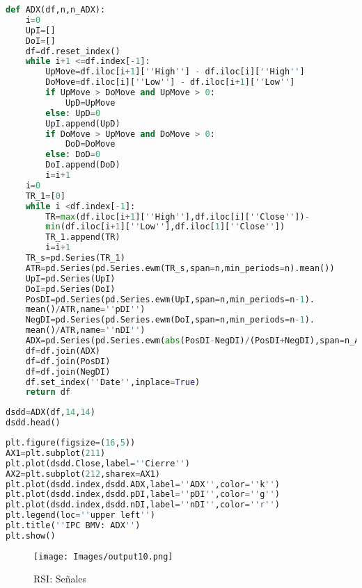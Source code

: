 \documentclass[letterpaper,12pt,oneside]{book}
\begin{document}
\begin{lstlisting}[language=Python]
def ADX(df,n,n_ADX):
    i=0
    UpI=[]
    DoI=[]
    df=df.reset_index()
    while i+1 <=df.index[-1]:
        UpMove=df.iloc[i+1][''High''] - df.iloc[i][''High'']
        DoMove=df.iloc[i][''Low''] - df.iloc[i+1][''Low'']
        if UpMove > DoMove and UpMove > 0:
            UpD=UpMove
        else: UpD=0
        UpI.append(UpD)
        if DoMove > UpMove and DoMove > 0:
            DoD=DoMove
        else: DoD=0
        DoI.append(DoD)
        i=i+1
    i=0
    TR_1=[0]
    while i <df.index[-1]:
        TR=max(df.iloc[i+1][''High''],df.iloc[i][''Close''])-
        min(df.iloc[i+1][''Low''],df.iloc[1][''Close''])
        TR_1.append(TR)
        i=i+1
    TR_s=pd.Series(TR_1)
    ATR=pd.Series(pd.Series.ewm(TR_s,span=n,min_periods=n).mean())
    UpI=pd.Series(UpI)
    DoI=pd.Series(DoI)
    PosDI=pd.Series(pd.Series.ewm(UpI,span=n,min_periods=n-1).
    mean()/ATR,name=''pDI'')
    NegDI=pd.Series(pd.Series.ewm(DoI,span=n,min_periods=n-1).
    mean()/ATR,name=''nDI'')
    ADX=pd.Series(pd.Series.ewm(abs(PosDI-NegDI)/(PosDI+NegDI),span=n_ADX,min_periods=n_ADX-1).mean(),name=''ADX'')
    df=df.join(ADX)
    df=df.join(PosDI)
    df=df.join(NegDI)
    df.set_index(''Date'',inplace=True)
    return df

\end{lstlisting}
\begin{lstlisting}[language=Python]
dsdd=ADX(df,14,14)
dsdd.head()
\end{lstlisting}


\begin{lstlisting}[language=Python]
plt.figure(figsize=(16,5))
AX1=plt.subplot(211)
plt.plot(dsdd.Close,label=''Cierre'')
AX2=plt.subplot(212,sharex=AX1)
plt.plot(dsdd.index,dsdd.ADX,label=''ADX'',color=''k'')
plt.plot(dsdd.index,dsdd.pDI,label=''pDI'',color=''g'')
plt.plot(dsdd.index,dsdd.nDI,label=''nDI'',color=''r'')
plt.legend(loc=''upper left'')
plt.title(''IPC BMV: ADX'')
plt.show()
\end{lstlisting}


\begin{figure}[ht]
	\centering
	\texttt{[image: Images/output10.png]}
	\caption{RSI: Señales}
	\label{fig:m11}
\end{figure}
\end{document}
